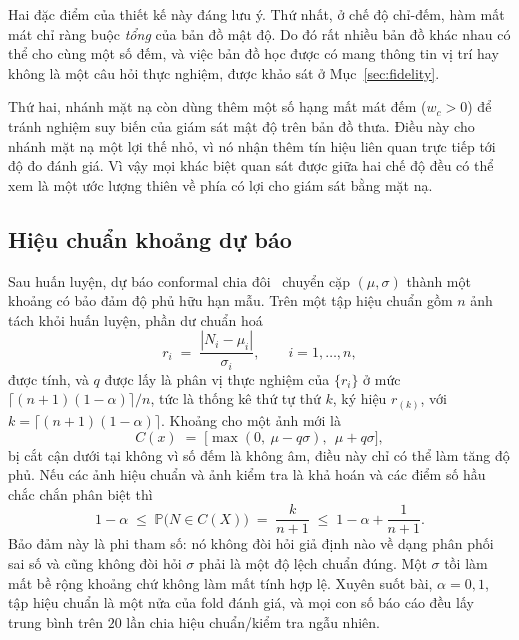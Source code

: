\documentclass[preprint,12pt]{elsarticle}
\begin{document}
Hai đặc điểm của thiết kế này đáng lưu ý. Thứ nhất, ở chế độ chỉ-đếm, hàm mất mát chỉ ràng buộc \emph{tổng} của
bản đồ mật độ. Do đó rất nhiều bản đồ khác nhau có thể cho cùng một số đếm, và việc bản đồ học được có mang thông
tin vị trí hay không là một câu hỏi thực nghiệm, được khảo sát ở Mục~\ref{sec:fidelity}.

Thứ hai, nhánh mặt nạ còn dùng thêm một số hạng mất mát đếm ($w_c > 0$) để tránh nghiệm suy biến của giám sát mật
độ trên bản đồ thưa. Điều này cho nhánh mặt nạ một lợi thế nhỏ, vì nó nhận thêm tín hiệu liên quan trực tiếp tới
độ đo đánh giá. Vì vậy mọi khác biệt quan sát được giữa hai chế độ đều có thể xem là một ước lượng thiên về phía
có lợi cho giám sát bằng mặt nạ.

\subsection{Hiệu chuẩn khoảng dự báo}\label{sec:conformal}
Sau huấn luyện, dự báo conformal chia đôi~\cite{vovk,cqr} chuyển cặp $(\mu,\sigma)$ thành một khoảng có bảo đảm độ
phủ hữu hạn mẫu. Trên một tập hiệu chuẩn gồm $n$ ảnh tách khỏi huấn luyện, phần dư chuẩn hoá
\begin{equation}
r_i \;=\; \frac{|N_i - \mu_i|}{\sigma_i}, \qquad i = 1,\dots,n,
\end{equation}
được tính, và $q$ được lấy là phân vị thực nghiệm của $\{r_i\}$ ở mức $\lceil (n+1)(1-\alpha)\rceil / n$, tức là
thống kê thứ tự thứ $k$, ký hiệu $r_{(k)}$, với $k = \lceil (n+1)(1-\alpha)\rceil$. Khoảng cho một ảnh mới là
\begin{equation}
C(x) \;=\; \big[\max(0,\ \mu - q\sigma),\ \ \mu + q\sigma\big],
\end{equation}
bị cắt cận dưới tại không vì số đếm là không âm, điều này chỉ có thể làm tăng độ phủ. Nếu các ảnh hiệu chuẩn và ảnh
kiểm tra là khả hoán và các điểm số hầu chắc chắn phân biệt thì~\cite{vovk}
\begin{equation}\label{eq:cov}
1-\alpha \;\le\; \mathbb{P}\big(N \in C(X)\big) \;=\; \frac{k}{n+1} \;\le\; 1-\alpha + \frac{1}{n+1}.
\end{equation}
Bảo đảm này là phi tham số: nó không đòi hỏi giả định nào về dạng phân phối sai số và cũng không đòi hỏi $\sigma$
phải là một độ lệch chuẩn đúng. Một $\sigma$ tồi làm mất bề rộng khoảng chứ không làm mất tính hợp lệ. Xuyên suốt
bài, $\alpha = 0{,}1$, tập hiệu chuẩn là một nửa của fold đánh giá, và mọi con số báo cáo đều lấy trung bình trên
$20$ lần chia hiệu chuẩn/kiểm tra ngẫu nhiên.
\end{document}
